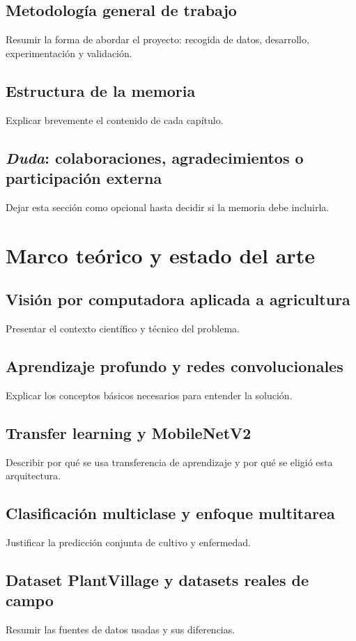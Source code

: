 \documentclass[11pt,spanish,listoffigures,listoftables]{tfgetsinf}
\begin{document}
\section{Metodología general de trabajo}
Resumir la forma de abordar el proyecto: recogida de datos, desarrollo, experimentación y validación.

\section{Estructura de la memoria}
Explicar brevemente el contenido de cada capítulo.

\section{\textit{Duda}: colaboraciones, agradecimientos o participación externa}
Dejar esta sección como opcional hasta decidir si la memoria debe incluirla.

\chapter{Marco teórico y estado del arte}
\section{Visión por computadora aplicada a agricultura}
Presentar el contexto científico y técnico del problema.

\section{Aprendizaje profundo y redes convolucionales}
Explicar los conceptos básicos necesarios para entender la solución.

\section{Transfer learning y MobileNetV2}
Describir por qué se usa transferencia de aprendizaje y por qué se eligió esta arquitectura.

\section{Clasificación multiclase y enfoque multitarea}
Justificar la predicción conjunta de cultivo y enfermedad.

\section{Dataset PlantVillage y datasets reales de campo}
Resumir las fuentes de datos usadas y sus diferencias.
\end{document}
